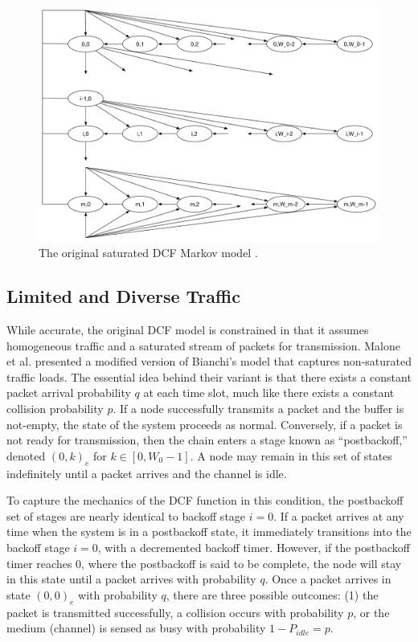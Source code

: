\documentclass[conference]{IEEEtran}
\begin{document}
\begin{figure}
\begin{center}
\includegraphics[scale=0.28]{../../sketches/dcf_model.pdf}
\caption{The original saturated DCF Markov model \cite{dcf}.}
\label{fig:dcf_model}
\end{center}
\end{figure}

\subsection{Limited and Diverse Traffic} \label{sec:nonsaturated}
While accurate, the original DCF model is constrained in that it assumes homogeneous traffic and a saturated stream of packets for transmission. Malone et al. \cite{dcf-nonsaturated} presented a modified version of Bianchi's model that captures non-saturated traffic loads. The essential idea behind their variant is that there exists a constant packet arrival probability $q$ at each time slot, much like there exists a constant collision probability $p$. If a node successfully transmits a packet and the buffer is not-empty, the state of the system proceeds as normal. Conversely, if a packet is not ready for transmission, then the chain enters a stage known as ``postbackoff,'' denoted $(0,k)_e$ for $k \in [0, W_0-1]$. A node may remain in this set of states indefinitely until a packet arrives and the channel is idle.

To capture the mechanics of the DCF function in this condition, the postbackoff set of stages are nearly identical to backoff stage $i = 0$. If a packet arrives at any time when the system is in a postbackoff state, it immediately transitions into the backoff stage $i = 0$, with a decremented backoff timer. However, if the postbackoff timer reaches $0$, where the postbackoff is said to be complete, the node will stay in this state until a packet arrives with probability $q$. Once a packet arrives in state $(0, 0)_e$ with probability $q$, there are three possible outcomes: (1) the packet is transmitted successfully, a collision occurs with probability $p$, or the medium (channel) is sensed as busy with probability $1 - P_{idle} = p$. 
\end{document}
